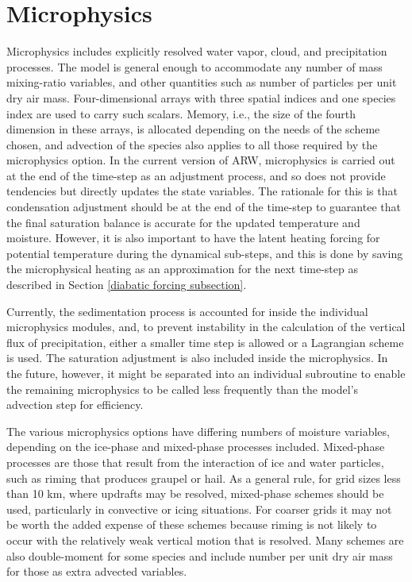 \section{Microphysics}

Microphysics includes explicitly resolved water vapor, cloud, and 
precipitation processes. The model is general enough to accommodate any 
number of mass mixing-ratio variables, and other quantities
such as number of particles per unit dry air mass. Four-dimensional arrays with three spatial
indices and one species index are used to carry such scalars.
Memory, i.e., the size of the fourth dimension in these
arrays, is allocated depending on the needs of the scheme chosen, 
and advection of the species also applies to all those required 
by the microphysics option. In the current version of ARW, microphysics 
is carried out at the end of the time-step as an adjustment process, 
and so does not provide tendencies but directly updates the state variables. 
The rationale for this is that 
condensation adjustment should be at the end of the time-step
to guarantee that the final saturation balance is accurate for the 
updated temperature and moisture. However, it is also important to 
have the latent heating forcing for potential temperature during the 
dynamical sub-steps, and this is done by saving the microphysical 
heating as an approximation for the next time-step as described in Section
\ref{diabatic forcing subsection}.

Currently, the sedimentation process is accounted for inside the 
individual microphysics modules, 
and, to prevent instability in the calculation of the vertical flux of
precipitation, either a smaller time step is allowed or a Lagrangian scheme is used. 
The saturation adjustment is also 
included inside the microphysics. In the future, however, it might be separated 
into an individual 
subroutine to enable the remaining microphysics to be called less frequently 
than the model's advection step for efficiency.

The various microphysics options have differing
numbers of moisture variables, depending on the ice-phase and mixed-phase
processes included. Mixed-phase processes are those that result from
the interaction of ice and water particles, such as riming that produces
graupel or hail.
As a general rule, for grid sizes less than 10 km, where updrafts may be
resolved, mixed-phase schemes should be used, particularly in convective
or icing situations. For coarser grids it may not be worth the added expense of these schemes
because riming is not likely to occur with the relatively weak vertical motion that is resolved.
Many schemes are also double-moment for some species and include
number per unit dry air mass for those as extra advected variables.

